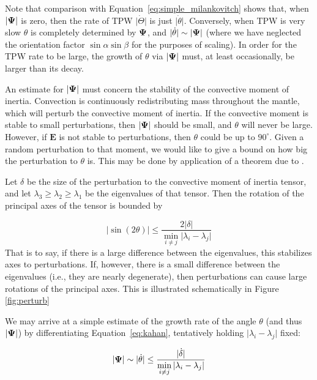 \documentclass[extra,mreferee]{gji}
\begin{document}
Note that comparison with Equation~\eqref{eq:simple_milankovitch} shows that, when $\vert \mitbf{\Psi} \vert$ is zero,
then the rate of TPW $\vert \dot{\Theta} \vert$ is just $\vert \dot{\theta} \vert$.
Conversely, when TPW is very slow $\theta$ is completely determined by $\mitbf{\Psi}$, and 
$\vert \dot{\theta} \vert \sim \vert \mitbf{\Psi} \vert$ 
(where we have neglected the orientation factor $\sin \alpha \sin \beta$ for the purposes of scaling).
In order for the TPW rate to be large, the growth of $\theta$ via $\vert \mitbf{\Psi} \vert$ must, 
at least occasionally, be larger than its decay.

An estimate for $\vert \mitbf{\Psi} \vert$ must concern the stability of the convective moment of inertia. 
Convection is continuously redistributing mass throughout the mantle, which will perturb the convective moment of inertia.  
If the convective moment is stable to small perturbations, then $\vert \mitbf{\Psi} \vert$ should be small, 
and $\theta$ will never be large.
However, if $\mathbf{E}$ is not stable to perturbations, then $\theta$ could be up to $90^\circ$. 
Given a random perturbation to that moment, we would like to give a bound on how big the perturbation to $\theta$ is. 
This may be done by application of a theorem due to \citet{davis1970rotation}.

Let $\delta$ be the size of the perturbation to the convective moment of inertia tensor, and let $\lambda_3 \ge \lambda_2 \ge \lambda_1$ be the eigenvalues of that tensor.  
Then the rotation of the principal axes of the tensor is bounded by

\begin{equation}
\vert \sin(2 \theta) \vert \le \frac{ 2 \vert \delta \vert}{ \displaystyle \min_{i \neq j} \vert \lambda_i - \lambda_j \vert }
\label{eq:kahan}
\end{equation} 
That is to say, if there is a large difference between the eigenvalues, this stabilizes axes to perturbations.  
If, however, there is a small difference between the eigenvalues (i.e., they are nearly degenerate), then perturbations can cause large rotations of the principal axes.
This is illustrated schematically in Figure \ref{fig:perturb}

We may arrive at a simple estimate of the growth rate of the angle $\theta$ (and thus $\vert \mitbf{\Psi} \vert$) 
by differentiating Equation~\eqref{eq:kahan}, tentatively holding $\vert \lambda_i - \lambda_j \vert$ fixed:

\begin{equation}
\vert \mitbf{\Psi} \vert \sim \vert \dot{\theta} \vert \le \frac{ \vert \dot{\delta} \vert}{ \displaystyle \min_{i \neq j} \vert \lambda_i - \lambda_j \vert }
\label{eq:grow_perturbation}
\end{equation} 
\end{document}
